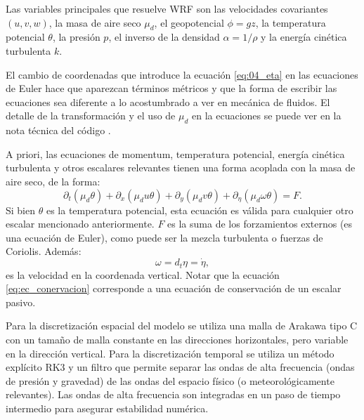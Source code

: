 Las variables principales que resuelve WRF son las velocidades covariantes $(u,v,w)$, la masa de aire seco $\mu_d$, el geopotencial $\phi = gz$, la temperatura potencial $\theta$, la presión $p$, el inverso de la densidad $\alpha= 1/\rho$ y la energía cinética turbulenta $k$. 

El cambio de coordenadas que introduce la ecuación \ref{eq:04_eta} en las ecuaciones de Euler hace que aparezcan términos métricos y que la forma de escribir las ecuaciones sea diferente a lo acostumbrado a ver en mecánica de fluidos. El detalle de la transformación y el uso de $\mu_d$ en la ecuaciones se puede ver en la nota técnica del código \citep{https://doi.org/10.5065/d68s4mvh}.

A priori, las ecuaciones de momentum, temperatura potencial, energía cinética turbulenta y otros escalares relevantes tienen una forma acoplada con la masa de aire seco, de la forma:
\begin{equation}\label{eq:ec_conervacion}
\partial_t (\mu_d\theta) + \partial_x(\mu_d u \theta)+\partial_y(\mu_d v \theta)+\partial_\eta (\mu_d \omega \theta) = F.
\end{equation}
Si bien $\theta$ es la temperatura potencial, esta ecuación es válida para cualquier otro escalar mencionado anteriormente.
$F$ es la suma de los forzamientos externos (es una ecuación de Euler), como puede ser la mezcla turbulenta o fuerzas de Coriolis. Además:
\begin{equation}
\omega = d_t\eta = \dot{\eta},
\end{equation}
es la velocidad en la coordenada vertical. Notar que la ecuación \ref{eq:ec_conervacion} corresponde a una ecuación de conservación de un escalar pasivo.

Para la discretización espacial del modelo se utiliza una malla de Arakawa tipo C con un tamaño de malla constante en las direcciones horizontales, pero variable en la dirección vertical. Para la discretización temporal se utiliza un método explícito RK3 y un filtro que permite separar las ondas de alta frecuencia (ondas de presión y gravedad) de las ondas del espacio físico (o meteorológicamente relevantes). Las ondas de alta frecuencia son integradas en un paso de tiempo intermedio para asegurar estabilidad numérica.

